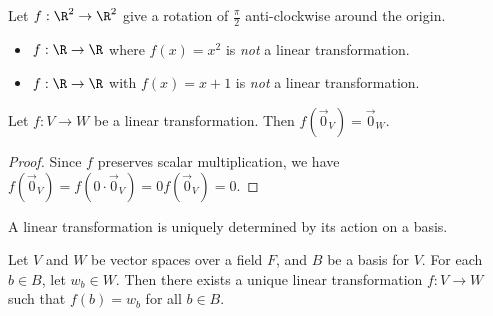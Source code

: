 \documentclass[12pt]{article}
\begin{document}
\begin{exmp}
    Let $f: \R^2 \to \R^2$ give a rotation of $\frac{\pi}{2}$ anti-clockwise around the origin.
\end{exmp}

\begin{exmp}\proofbreak
    \begin{itemize}
        \item $f: \R \to \R$ where $f(x) = x^2$ is \emph{not} a linear transformation.
        \item $f: \R \to \R$ with $f(x) = x + 1$ is \emph{not} a linear transformation.
    \end{itemize}
\end{exmp}

\begin{prop}\label{zero-maps-to-zero}
    Let $f: V \to W$ be a linear transformation. Then $f(\vec{0}_V) = \vec{0}_W$.
\end{prop}

\begin{proof}
    Since $f$ preserves scalar multiplication, we have $f(\vec{0}_V) = f(0 \cdot \vec{0}_V) = 0f(\vec{0}_V) = 0$.
\end{proof}

\begin{prop}\label{action-on-basis}
    A linear transformation is uniquely determined by its action on a basis.

    Let $V$ and $W$ be vector spaces over a field $F$, and $B$ be a basis for $V$. For each $b \in B$, let $w_b \in W$. Then there exists a unique linear transformation $f: V \to W$ such that $f(b) = w_b$ for all $b \in B$.
\end{prop}
\end{document}
